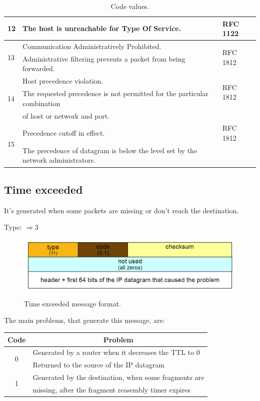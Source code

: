 \begin{table}[H]
\begin{tabular}{|l|l|l|}
\hline
\footnotesize{12} & {\footnotesize{The host is unreachable for Type Of Service.}} & {\footnotesize{RFC 1122}}\\
\hline
\multirow{2}{*}{\footnotesize{13}} & {\footnotesize{Communication Administratively Prohibited.}} & \multirow{2}{*}{\footnotesize{RFC 1812}}\\
& {\footnotesize{Administrative filtering prevents a packet from being forwarded.}} & 	\\
\hline
\multirow{3}{*}{\footnotesize{14}} & {\footnotesize{Host precedence violation.}} & \multirow{2}{*}{\footnotesize{RFC 1812}}\\
& {\footnotesize{The requested precedence is not permitted for the particular combination}} &\\
& {\footnotesize{of host or network and port.}} & \\
\hline
\multirow{2}{*}{\footnotesize{15}} & {\footnotesize{Precedence cutoff in effect.}} & 	{\footnotesize{RFC 1812}}\\
& {\footnotesize{The precedence of datagram is below the level set by the network administrators.}} &\\
\hline
\end{tabular}
\caption{\footnotesize{Code values.}}
\end{table}
\subsection{Time exceeded}
It's generated when some packets are missing or don't reach the destination.
\begin{center}
Type: $\Rightarrow 3$\\
\end{center}
\begin{figure}[H]
\centering
\includegraphics[scale=0.35, angle=0]{./Images/ICMP/Time_exceeded}
\caption{\footnotesize{Time exceeded message format.}}
\end{figure}
The main problems, that generate this message, are: 
\begin{table}[H]
\centering\footnotesize
\begin{tabular}{|c|l|}
\multicolumn{1}{c}{\textbf{Code}} & \multicolumn{1}{c}{\textbf{Problem}}\\
\hline
\multirow{2}{*}{0} & {Generated by a router when it decreases the TTL to 0}\\
\cline{2-2}
{ } & {Returned to the source of the IP datagram}\\
\hline
\multirow{2}{*}{1} & {Generated by the destination, when some fragments are}\\
{} & {missing, after the fragment reasembly timer expires}\\
\hline
\end{tabular}
\end{table}

